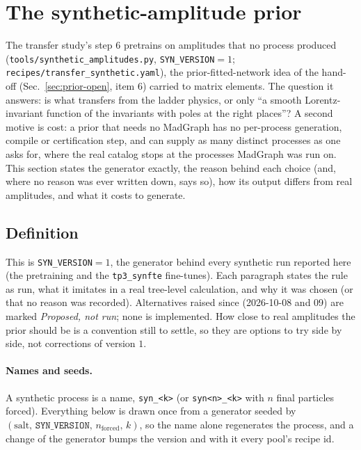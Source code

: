 \documentclass[11pt]{article}
\newcommand{\code}[1]{\texttt{#1}}
\begin{document}
\section{The synthetic-amplitude prior}\label{sec:synthetic}
The transfer study's step $6$ pretrains on amplitudes that no process produced (\code{tools/synthetic\_amplitudes.py},
\code{SYN\_VERSION}$=1$; \code{recipes/transfer\_synthetic.yaml}), the prior-fitted-network idea of the hand-off
(Sec.~\ref{sec:prior-open}, item $6$) carried to matrix elements. The question it answers: is what transfers from the
ladder physics, or only ``a smooth Lorentz-invariant function of the invariants with poles at the right places''? A
second motive is cost: a prior that needs no MadGraph has no per-process generation, compile or certification step, and
can supply as many distinct processes as one asks for, where the real catalog stops at the processes MadGraph was run on.
This section states the generator exactly, the reason behind each choice (and, where no reason was ever written down,
says so), how its output differs from real amplitudes, and what it costs to generate.

\subsection{Definition}
This is \code{SYN\_VERSION}$=1$, the generator behind every synthetic run reported here (the pretraining and the
\code{tp3\_synfte} fine-tunes). Each paragraph states the rule as run, what it imitates in a real tree-level
calculation, and why it was chosen (or that no reason was recorded). Alternatives raised since (2026-10-08 and 09) are
marked \emph{Proposed, not run}; none is implemented. How close to real amplitudes the prior should be is a convention
still to settle, so they are options to try side by side, not corrections of version $1$.

\paragraph{Names and seeds.} A synthetic process is a name, \code{syn\_<k>} (or \code{syn<n>\_<k>} with $n$ final
particles forced). Everything below is drawn once from a generator seeded by
$(\text{salt},\,\code{SYN\_VERSION},\,n_\text{forced},\,k)$, so the name alone regenerates the process, and a change of
the generator bumps the version and with it every pool's recipe id.
\end{document}
